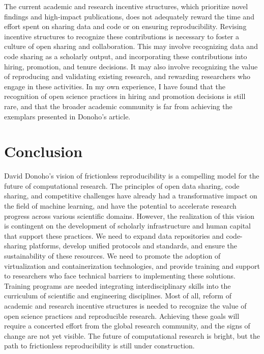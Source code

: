 \documentclass[]{hdsr}
\begin{document}
The current academic and research incentive structures, which prioritize novel findings and high-impact publications, does not adequately reward the time and effort spent on sharing data and code or on ensuring reproducibility. Revising incentive structures to recognize these contributions is necessary to foster a culture of open sharing and collaboration. This may involve recognizing data and code sharing as a scholarly output, and incorporating these contributions into hiring, promotion, and tenure decisions. It may also involve recognizing the value of reproducing and validating existing research, and rewarding researchers who engage in these activities. In my own experience, I have found that the recognition of open science practices in hiring and promotion decisions is still rare, and that the broader academic community is far from achieving the exemplars presented in Donoho's article.

\section*{Conclusion}
David Donoho's vision of frictionless reproducibility is a compelling model for the future of computational research. The principles of open data sharing, code sharing, and competitive challenges have already had a transformative impact on the field of machine learning, and have the potential to accelerate research progress across various scientific domains. However, the realization of this vision is contingent on the development of scholarly infrastructure and human capital that support these practices. We need to expand data repositories and code-sharing platforms, develop unified protocols and standards, and ensure the sustainability of these resources. We need to promote the adoption of virtualization and containerization technologies, and provide training and support to researchers who face technical barriers to implementing these solutions. Training programs are needed integrating interdisciplinary skills into the curriculum of scientific and engineering disciplines. Most of all, reform of academic and research incentive structures is needed to recognize the value of open science practices and reproducible research. Achieving these goals will require a concerted effort from the global research community, and the signs of change are not yet visible. The future of computational research is bright, but the path to frictionless reproducibility is still under construction.


\end{document}
